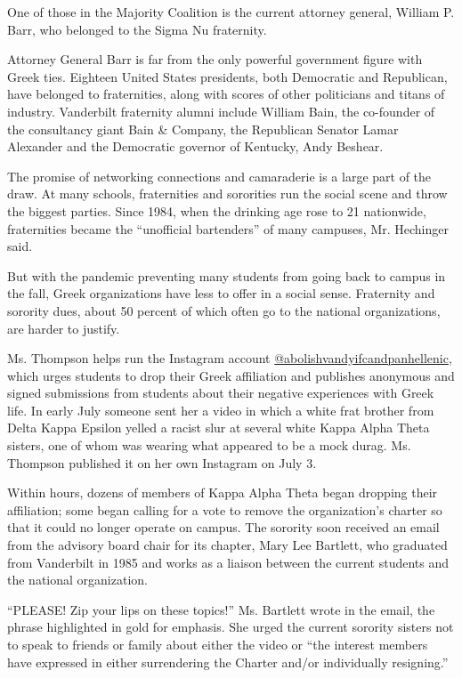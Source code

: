 One of those in the Majority Coalition is the current attorney general,
William P. Barr, who belonged to the Sigma Nu fraternity.

Attorney General Barr is far from the only powerful government figure
with Greek ties. Eighteen United States presidents, both Democratic and
Republican, have belonged to fraternities, along with scores of other
politicians and titans of industry. Vanderbilt fraternity alumni include
William Bain, the co-founder of the consultancy giant Bain \& Company,
the Republican Senator Lamar Alexander and the Democratic governor of
Kentucky, Andy Beshear.

The promise of networking connections and camaraderie is a large part of
the draw. At many schools, fraternities and sororities run the social
scene and throw the biggest parties. Since 1984, when the drinking age
rose to 21 nationwide, fraternities became the ``unofficial bartenders''
of many campuses, Mr. Hechinger said.

But with the pandemic preventing many students from going back to campus
in the fall, Greek organizations have less to offer in a social sense.
Fraternity and sorority dues, about 50 percent of which often go to the
national organizations, are harder to justify.

Ms. Thompson helps run the Instagram account
\href{https://www.instagram.com/abolishvandyifcandpanhellenic/}{@abolishvandyifcandpanhellenic},
which urges students to drop their Greek affiliation and publishes
anonymous and signed submissions from students about their negative
experiences with Greek life. In early July someone sent her a video in
which a white frat brother from Delta Kappa Epsilon yelled a racist slur
at several white Kappa Alpha Theta sisters, one of whom was wearing what
appeared to be a mock durag. Ms. Thompson published it on her own
Instagram on July 3.

Within hours, dozens of members of Kappa Alpha Theta began dropping
their affiliation; some began calling for a vote to remove the
organization's charter so that it could no longer operate on campus. The
sorority soon received an email from the advisory board chair for its
chapter, Mary Lee Bartlett, who graduated from Vanderbilt in 1985 and
works as a liaison between the current students and the national
organization.

``PLEASE! Zip your lips on these topics!'' Ms. Bartlett wrote in the
email, the phrase highlighted in gold for emphasis. She urged the
current sorority sisters not to speak to friends or family about either
the video or ``the interest members have expressed in either
surrendering the Charter and/or individually resigning.''

